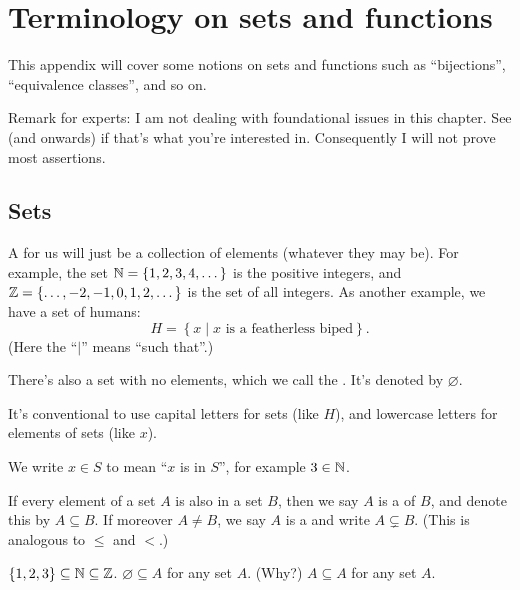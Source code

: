 \chapter{Terminology on sets and functions}
\label{ch:sets_functions}
This appendix will cover some notions on sets and functions
such as ``bijections'', ``equivalence classes'', and so on.

Remark for experts: I am not dealing with foundational issues in this chapter.
See  (and onwards) if that's what you're interested in.
Consequently I will not prove most assertions.

\section{Sets}
A  for us will just be a collection of elements (whatever they may be).
For example, the set $\mathbb N = \{1, 2, 3, 4, \dots\}$ is the positive integers,
and $\mathbb Z = \{ \dots, -2, -1, 0, 1, 2, \dots\}$ is the set of all integers.
As another example, we have a set of humans:
\[ H = \left\{ x \mid \text{$x$ is a featherless biped} \right\}. \]
(Here the ``$\mid$'' means ``such that''.)

There's also a set with no elements, which we call the .
It's denoted by $\varnothing$.

It's conventional to use capital letters for sets (like $H$),
and lowercase letters for elements of sets (like $x$).

\begin{definition}
We write $x \in S$ to mean ``$x$ is in $S$'', for example $3 \in \mathbb N$.
\end{definition}

\begin{definition}
	If every element of a set $A$ is also in a set $B$,
	then we say $A$ is a  of $B$,
	and denote this by $A \subseteq B$.
	If moreover $A \neq B$, we say $A$ is a 
	and write $A \subsetneq B$.
	(This is analogous to $\le$ and $<$.)
\end{definition}
\begin{example}
	\listhack
	\begin{enumerate}[(a)]
		\ii $\{1,2,3\} \subseteq \mathbb N \subseteq \mathbb Z$.
		\ii $\varnothing \subseteq A$ for any set $A$. (Why?)
		\ii $A \subseteq A$ for any set $A$.
	\end{enumerate}
\end{example}

